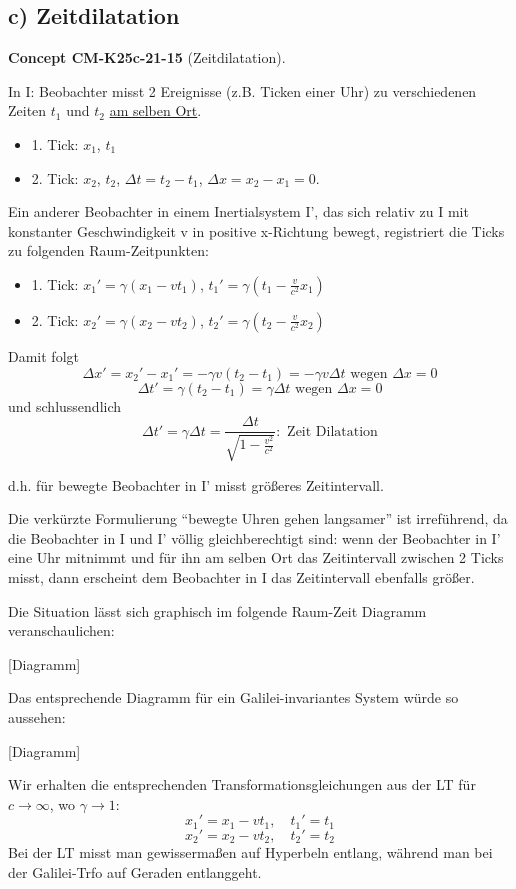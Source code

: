 \documentclass[10pt, letterpaper]{article}
\newcommand{\CustomHeading}[3]{%
  \par\medskip\noindent%
  \textbf{#1 #2} \textnormal{(#3)}.\enskip%
}
\newenvironment{CONC}[2]{\begin{unitbox}\CustomHeading{Concept}{#1}{#2}}{\end{unitbox}}
\begin{document}
\subsection*{c) Zeitdilatation}

\begin{CONC}{CM-K25c-21-15}{Zeitdilatation}
In I: Beobachter misst 2 Ereignisse (z.B. Ticken einer Uhr) zu verschiedenen Zeiten $t_1$ und $t_2$ \underline{am selben Ort}.

\begin{itemize}
  \item 1. Tick: $x_1$, $t_1$

  \item 2. Tick: $x_2$, $t_2$, $\Delta t = t_2-t_1$, $\Delta x = x_2-x_1=0$.
\end{itemize}

Ein anderer Beobachter in einem Inertialsystem I', das sich relativ zu I mit konstanter Geschwindigkeit v in positive x-Richtung bewegt, registriert die Ticks zu folgenden Raum-Zeitpunkten:

\begin{itemize}
  \item 1. Tick: $x_1' = \gamma(x_1-vt_1)$, $t_1' = \gamma(t_1-\frac{v}{c^2}x_1)$

  \item 2. Tick: $x_2' = \gamma(x_2-vt_2)$, $t_2' = \gamma(t_2-\frac{v}{c^2}x_2)$
\end{itemize}
Damit folgt
\[ \Delta x' = x_2'-x_1' = -\gamma v(t_2-t_1) = -\gamma v \Delta t \text{ wegen } \Delta x=0\]
\[\Delta t' = \gamma(t_2-t_1) = \gamma\Delta t \text{ wegen } \Delta x=0\]
und schlussendlich
\[\Delta t' = \gamma\Delta t = \frac{\Delta t}{\sqrt{1-\frac{v^2}{c^2}}} : \text{ Zeit Dilatation}\]

d.h. für bewegte Beobachter in I' misst größeres Zeitintervall.

Die verkürzte Formulierung ``bewegte Uhren gehen langsamer'' ist irreführend, da die Beobachter in I und I' völlig gleichberechtigt sind: wenn der Beobachter in I' eine Uhr mitnimmt und für ihn am selben Ort das Zeitintervall zwischen 2 Ticks misst, dann erscheint dem Beobachter in I das Zeitintervall ebenfalls größer.

Die Situation lässt sich graphisch im folgende Raum-Zeit Diagramm veranschaulichen:

[Diagramm]

Das entsprechende Diagramm für ein Galilei-invariantes System würde so aussehen:

[Diagramm]

Wir erhalten die entsprechenden Transformationsgleichungen aus der LT für $c \to \infty$, wo $\gamma \to 1$:
\[
x_1' = x_1 - vt_1, \quad t_1' = t_1
\]
\[
x_2' = x_2 - vt_2, \quad t_2' = t_2
\]
Bei der LT misst man gewissermaßen auf Hyperbeln entlang, während man bei der Galilei-Trfo auf Geraden entlanggeht.
\end{CONC}
\end{document}

